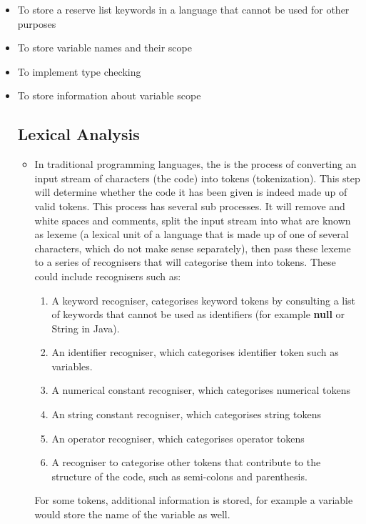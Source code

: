 \documentclass[ %
                    author={Jonathan Rankin},
                supervisor={Dr. David May, Dr. Ian Holyer},
                    degree={MEng},
                     title={CodeTouch},
                  subtitle={A Revolutionary Way To Program Real Code On Touch Screen Devices},
                      type={enterprise},
                      year={2015 } ]{dissertation}
\begin{document}
\begin{itemize}
\item To store a reserve list keywords in a language that cannot be used for other purposes
\item To store variable names and their scope
\item To implement type checking
\item To store information about variable scope

\subsection{Lexical Analysis}

\begin{itemize}
\item[]
In traditional programming languages, the is the process of converting an input stream of characters (the code) into tokens (tokenization). This step will determine whether the code it has been given is indeed made up of valid tokens. This process has several sub processes. It will remove and white spaces and comments, split the input stream into what are known as lexeme (a lexical unit of a language that is made up of one of several characters, which do not make sense separately), then pass these lexeme to a series of recognisers that will categorise them into tokens. These could include recognisers such as:

\begin{enumerate}
\item A keyword recogniser, categorises keyword tokens by consulting a list of keywords that cannot be used as identifiers (for example \textbf{null} or {String} in Java). 
\item An identifier recogniser, which categorises identifier token such as variables. 
\item A numerical constant recogniser, which categorises numerical tokens
\item An string constant recogniser, which categorises string tokens
\item An operator recogniser, which categorises operator tokens
\item A recogniser to categorise other tokens that contribute to the structure  of the code, such as semi-colons and parenthesis.
\end{enumerate}


For some tokens, additional information is stored, for example a variable would store the name of the variable as well. 


\end{itemize}
\end{itemize}
\end{document}

